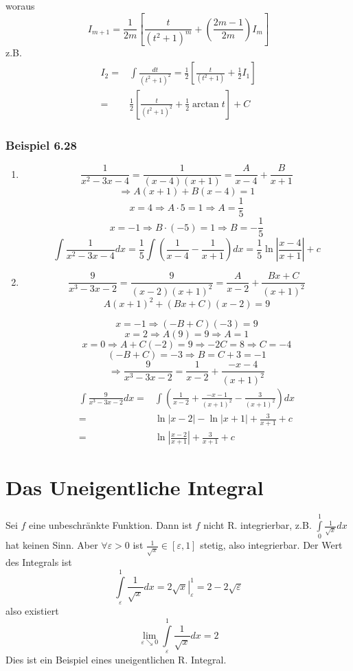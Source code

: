\begin{itemize}
woraus \[I_{m+1}=\frac{1}{2m}\left[\frac{t}{(t^2 +1)^m} + \left(\frac{2m-1}{2m}\right)I_m\right]\]
z.B.
\begin{align*}
I_2=&\int{\frac{dt}{(t^2 +1)^2}}=\frac{1}{2}\left[ \frac{t}{(t^2 +1)}+\frac{1}{2}I_1\right]\\
=&\frac{1}{2}\left[ \frac{t}{(t^2 +1)^2}+\frac{1}{2}\arctan t\right] + C
\end{align*}

\end{itemize}
\subsubsection*{Beispiel 6.28}
\begin{enumerate}
\item \[\frac{1}{x^2 -3x -4}=\frac{1}{(x-4)(x+1)}=\frac{A}{x-4}+\frac{B}{x+1}\]
\[\Rightarrow A(x+1)+B(x-4)=1\]
\[x=4\Rightarrow A\cdot 5=1\Rightarrow A=\frac{1}{5}\]
\[x=-1\Rightarrow B\cdot (-5)=1\Rightarrow B=-\frac{1}{5}\]
\[\int {\frac{1}{{{x^2} - 3x - 4}}dx = \frac{1}{5}\int {\left( {\frac{1}{{x - 4}} - \frac{1}{{x + 1}}} \right)dx = \frac{1}{5}} } \ln \left| {\frac{{x - 4}}{{x + 1}}} \right| + c\]
\item \[\frac{9}{{{x^3} - 3x - 2}} = \frac{9}{{(x - 2){{(x + 1)}^2}}} = \frac{A}{{x - 2}} + \frac{{Bx + C}}{{{{(x + 1)}^2}}}\]
\[A{(x + 1)^2} + (Bx + C)(x - 2) = 9\]

\[x=-1\Rightarrow(-B+C)(-3)=9\]
\[x=2\Rightarrow A(9)=9\Rightarrow A=1\]
\[x=0\Rightarrow A+C(-2)=9\Rightarrow -2C=8\Rightarrow C=-4\]
\[(-B+C)=-3\Rightarrow B=C+3=-1\]
\[\Rightarrow \frac{9}{x^3-3x-2}=\frac{1}{x-2}+\frac{-x-4}{(x+1)^2}\]
\begin{align*}
\int \frac{9}{{{x^3} - 3x - 2}}dx =&\int {\left( {\frac{1}{{x - 2}} + \frac{{ - x - 1}}{{{{(x + 1)}^2}}} - \frac{3}{{{{(x + 1)}^2}}}} \right)dx} \\
 =&\ln \left| {x - 2} \right| - \ln \left| {x + 1} \right| + \frac{3}{{x + 1}} + c\\
 =&\ln \left| {\frac{{x - 2}}{{x + 1}}} \right| + \frac{3}{{x + 1}} + c
\end{align*}
\end{enumerate}
\section{Das Uneigentliche Integral}
Sei $f$ eine unbeschränkte Funktion. Dann ist $f$ nicht R. integrierbar, z.B. $\int\limits_0^1 {\frac{1}{{\sqrt x }}} dx$ hat keinen Sinn. Aber $\forall\varepsilon>0$ ist $\frac{1}{\sqrt{x}}\in\left[\varepsilon,1 \right]$ stetig, also integrierbar. Der Wert des Integrals ist \[\int\limits_\varepsilon ^1 {\frac{1}{{\sqrt x }}} dx = \left. {2\sqrt x } \right|_\varepsilon ^1 = 2 - 2\sqrt \varepsilon  \] also existiert \[\mathop {\lim }\limits_{\varepsilon  \searrow 0} \int\limits_\varepsilon ^1 {\frac{1}{{\sqrt x }}} dx = 2\] Dies ist ein Beispiel eines uneigentlichen R. Integral.

